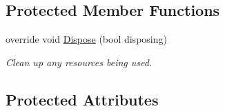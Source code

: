 \subsection*{Protected Member Functions}
\begin{DoxyCompactItemize}
\item 
override void \hyperlink{classlib_watcher_dialog_1_1_property_item_1_1_thread_1_1_thread_properties_menu_a74f0d7586519c770c5a64f5f5a6c58cf}{Dispose} (bool disposing)
\begin{DoxyCompactList}\small\item\em Clean up any resources being used. \end{DoxyCompactList}\end{DoxyCompactItemize}
\subsection*{Protected Attributes}
